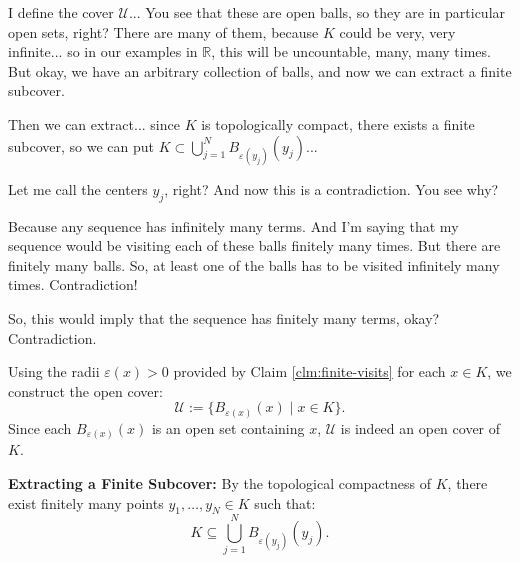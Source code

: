 \begin{proofWrapper}
\begin{speech}[00:16:25 - 00:19:00]
I define the cover $\mathcal{U}$...  You see that these are open balls, so they are in particular open sets, right? There are many of them, because $K$ could be very, very infinite... so in our examples in $\mathbb{R}$, this will be uncountable, many, many times. But okay, we have an arbitrary collection of balls, and now we can extract a finite subcover.

Then we can extract... since $K$ is topologically compact,  there exists a finite subcover, so we can put $K \subset \bigcup_{j=1}^N B_{\varepsilon(y_j)}(y_j)$... 

Let me call the centers $y_j$, right? And now this is a contradiction. You see why?

Because any sequence has infinitely many terms. And I'm saying that my sequence would be visiting each of these balls finitely many times. But there are finitely many balls. So, at least one of the balls has to be visited infinitely many times. Contradiction!

So, this would imply that the sequence has finitely many terms,  okay? Contradiction. 
\end{speech}

\begin{content}
Using the radii $\varepsilon(x) > 0$ provided by Claim \ref{clm:finite-visits} for each $x \in K$, we construct the open cover:
\begin{equation}\label{eq:epsilon-cover}
\mathcal{U} := \bigl\{ B_{\varepsilon(x)}(x) \;\big|\; x \in K \bigr\}.
\end{equation}
Since each $B_{\varepsilon(x)}(x)$ is an open set containing $x$, $\mathcal{U}$ is indeed an open cover of $K$.

\textbf{Extracting a Finite Subcover:}
By the topological compactness of $K$, there exist finitely many points $y_1, \dots, y_N \in K$ such that:
\begin{equation}\label{eq:finite-subcover-balls}
K \subseteq \bigcup_{j=1}^N B_{\varepsilon(y_j)}(y_j).
\end{equation}


\end{content}
\end{proofWrapper}
